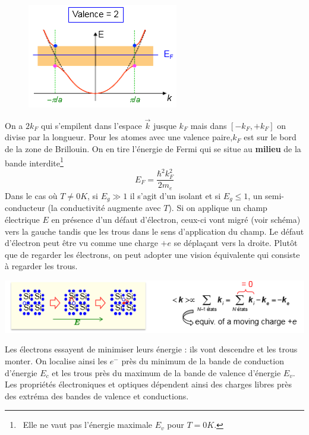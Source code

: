 	\begin{figure}
	\vspace{-5mm}
	\includegraphics[scale=0.6]{ch5/image9}
	\end{figure}
	On a $2k_F$ qui s'empilent dans l'espace $\vec k$ jusque $k_F$ mais dans $[-k_F,+k_F]$ on 
	divise par la longueur. Pour les atomes avec une valence paire,$k_F$ est sur le bord de la 
	zone de Brillouin. On en tire l'énergie de Fermi qui se situe au \textbf{milieu} de la bande
	interdite\footnote{\danger\ Elle ne vaut pas l'énergie maximale $E_v$ pour $T=0K$.}
	\begin{equation}
	E_F = \dfrac{\hbar^2k_F^2}{2m_e}
	\end{equation}
	Dans le cas où $T\neq 0K$, si $E_g\gg1$ il s'agit d'un isolant et si $E_g\leq 1$, un 
	semi-conducteur (la conductivité augmente avec $T$). Si on applique un champ électrique 
	$E$ en présence d'un défaut d'électron, ceux-ci vont migré (voir schéma) vers la gauche 
	tandis que les trous dans le sens d'application du champ. Le défaut d'électron peut être
	vu comme une charge $+e$ se déplaçant vers la droite. Plutôt que de regarder les électrons, 
	on peut adopter une vision équivalente qui consiste à regarder les trous.
	\begin{center}
	\includegraphics[scale=0.6]{ch5/image10}
	\end{center}
	Les électrons essayent de minimiser leurs énergie : ils vont descendre et les trous monter. On 
	localise ainsi les $e^-$ près du minimum de la bande de conduction d'énergie $E_c$ et les trous
	près du maximum de la bande de valence d'énergie $E_v$. Les propriétés électroniques et 
	optiques dépendent ainsi des charges libres près des extréma des bandes de valence et conductions.\\

